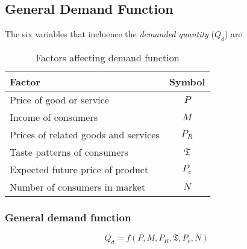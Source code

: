 \documentclass[oneside]{book}
\begin{document}
\subsection{General Demand Function}
The six variables that incluence the \textit{demanded quantity} ($Q_d$) are
\begin{table}[ht]
	\centering
	\begin{tabular}{|lc|}
		\hline
		\textbf{Factor}                      & \textbf{Symbol}  \\
		\hline
		Price of good or service             & \(P\)            \\
		Income of consumers                  & \(M\)            \\
		Prices of related goods and services & \(P_R\)          \\
		Taste patterns of consumers          & \(\mathfrak{T}\) \\
		Expected future price of product     & \(P_e\)          \\
		Number of consumers in market        & \(N\)            \\
		\hline
	\end{tabular}
	\caption{Factors affecting demand function}
\end{table}
\subsubsection{General demand function}
\[
	Q_d = f(P, M, P_R, \mathfrak{T}, P_e ,N)
\]
\end{document}
